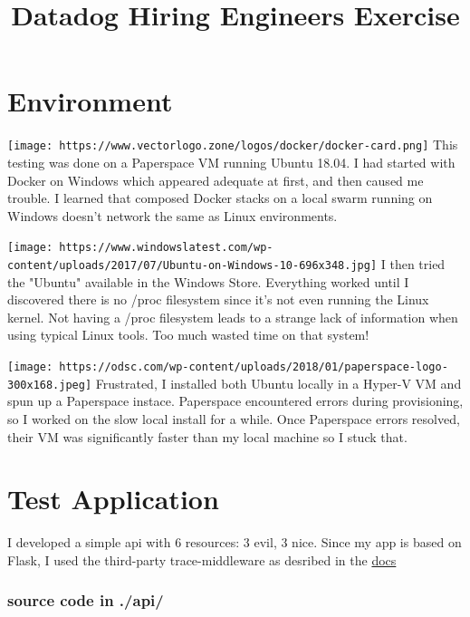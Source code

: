 \documentclass[11pt]{article}
\title{Datadog Hiring Engineers Exercise}
\begin{document}
    
    
    \maketitle
    
    

    
    \section{Environment}\label{environment}

    \texttt{[image: https://www.vectorlogo.zone/logos/docker/docker-card.png]}
This testing was done on a Paperspace VM running Ubuntu 18.04. I had
started with Docker on Windows which appeared adequate at first, and
then caused me trouble. I learned that composed Docker stacks on a local
swarm running on Windows doesn't network the same as Linux environments.

\texttt{[image: https://www.windowslatest.com/wp-content/uploads/2017/07/Ubuntu-on-Windows-10-696x348.jpg]}
I then tried the "Ubuntu" available in the Windows Store. Everything
worked until I discovered there is no /proc filesystem since it's not
even running the Linux kernel. Not having a /proc filesystem leads to a
strange lack of information when using typical Linux tools. Too much
wasted time on that system!

\texttt{[image: https://odsc.com/wp-content/uploads/2018/01/paperspace-logo-300x168.jpeg]}
Frustrated, I installed both Ubuntu locally in a Hyper-V VM and spun up
a Paperspace instace. Paperspace encountered errors during provisioning,
so I worked on the slow local install for a while. Once Paperspace
errors resolved, their VM was significantly faster than my local machine
so I stuck that.

    \section{Test Application}\label{test-application}

    I developed a simple api with 6 resources: 3 evil, 3 nice. Since my app
is based on Flask, I used the third-party trace-middleware as desribed
in the
\href{https://docs.datadoghq.com/tracing/setup/python/\#example-simple-tracing}{docs}

\subsubsection{source code in ./api/}\label{source-code-in-.api}
\end{document}
